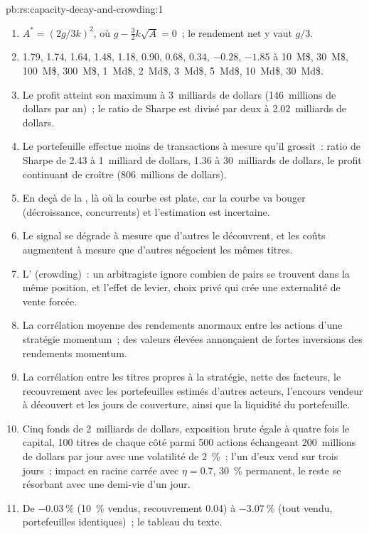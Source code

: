 \begin{solution}{pb:rs:capacity-decay-and-crowding:1}
\begin{enumerate}
\item $A^* = (2g/3k)^2$, où $g - \frac32 k\sqrt A = 0$~; le rendement net y vaut $g/3$.
\item 1.79, 1.74, 1.64, 1.48, 1.18, 0.90, 0.68, 0.34, $-0.28$, $-1.85$ à 10~M\$, 30~M\$, 100~M\$, 300~M\$, 1~Md\$, 2~Md\$, 3~Md\$, 5~Md\$, 10~Md\$, 30~Md\$.
\item Le profit atteint son maximum à 3~milliards de dollars (146~millions de dollars par an)~; le ratio de Sharpe est divisé par deux à 2.02~milliards de dollars.
\item Le portefeuille effectue moins de transactions à mesure qu'il grossit~: ratio de Sharpe de 2.43 à 1~milliard de dollars, 1.36 à 30~milliards de dollars, le profit continuant de croître (806~millions de dollars).
\item En deçà de la , là où la courbe est plate, car la courbe va bouger (décroissance, concurrents) et l'estimation est incertaine.
\item Le signal se dégrade à mesure que d'autres le découvrent, et les coûts augmentent à mesure que d'autres négocient les mêmes titres.
\item L' (crowding)~: un arbitragiste ignore combien de pairs se trouvent dans la même position, et l'effet de levier, choix privé qui crée une externalité de vente forcée.
\item La corrélation moyenne des rendements anormaux entre les actions d'une stratégie momentum~; des valeurs élevées annonçaient de fortes inversions des rendements momentum.
\item La corrélation entre les titres propres à la stratégie, nette des facteurs, le recouvrement avec les portefeuilles estimés d'autres acteurs, l'encours vendeur à découvert et les jours de couverture, ainsi que la liquidité du portefeuille.
\item Cinq fonds de 2~milliards de dollars, exposition brute égale à quatre fois le capital, 100 titres de chaque côté parmi 500 actions échangeant 200~millions de dollars par jour avec une volatilité de 2~\%~; l'un d'eux vend sur trois jours~;
impact en racine carrée avec $\eta = 0.7$, 30~\% permanent, le reste se résorbant avec une demi-vie d'un jour.
\item De $-0.03~\%$ (10~\% vendus, recouvrement 0.04) à $-3.07~\%$ (tout vendu, portefeuilles identiques)~; le tableau du texte.

\end{enumerate}
\end{solution}
